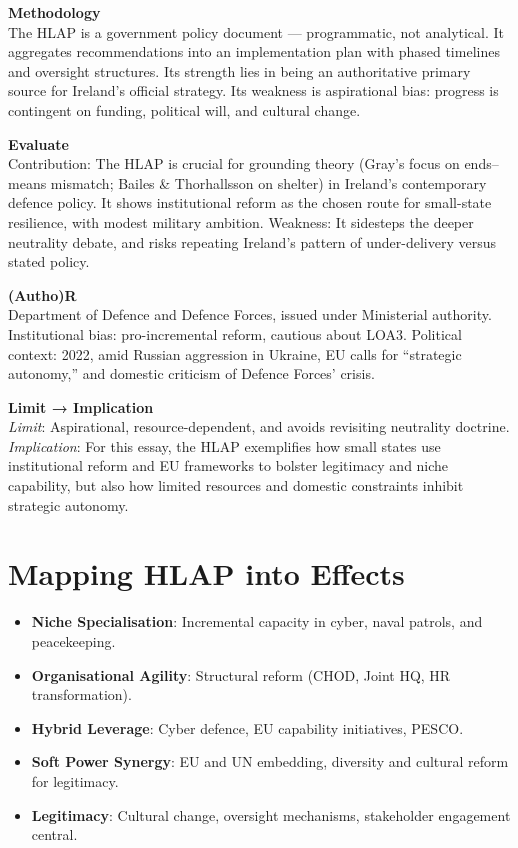 \textbf{Methodology} \\
The HLAP is a government policy document — programmatic, not analytical. It aggregates recommendations into an implementation plan with phased timelines and oversight structures. Its strength lies in being an authoritative primary source for Ireland’s official strategy. Its weakness is aspirational bias: progress is contingent on funding, political will, and cultural change.  

\textbf{Evaluate} \\
Contribution: The HLAP is crucial for grounding theory (Gray’s focus on ends–means mismatch; Bailes \& Thorhallsson on shelter) in Ireland’s contemporary defence policy. It shows institutional reform as the chosen route for small-state resilience, with modest military ambition. Weakness: It sidesteps the deeper neutrality debate, and risks repeating Ireland’s pattern of under-delivery versus stated policy.  

\textbf{(Autho)R} \\
Department of Defence and Defence Forces, issued under Ministerial authority. Institutional bias: pro-incremental reform, cautious about LOA3. Political context: 2022, amid Russian aggression in Ukraine, EU calls for “strategic autonomy,” and domestic criticism of Defence Forces’ crisis.  

\textbf{Limit → Implication} \\
\textit{Limit}: Aspirational, resource-dependent, and avoids revisiting neutrality doctrine.  
\textit{Implication}: For this essay, the HLAP exemplifies how small states use institutional reform and EU frameworks to bolster legitimacy and niche capability, but also how limited resources and domestic constraints inhibit strategic autonomy.  

\section*{Mapping HLAP into Effects}

\begin{itemize}
	\item \textbf{Niche Specialisation}: Incremental capacity in cyber, naval patrols, and peacekeeping.  
	\item \textbf{Organisational Agility}: Structural reform (CHOD, Joint HQ, HR transformation).  
	\item \textbf{Hybrid Leverage}: Cyber defence, EU capability initiatives, PESCO.  
	\item \textbf{Soft Power Synergy}: EU and UN embedding, diversity and cultural reform for legitimacy.  
	\item \textbf{Legitimacy}: Cultural change, oversight mechanisms, stakeholder engagement central.  
\end{itemize}

